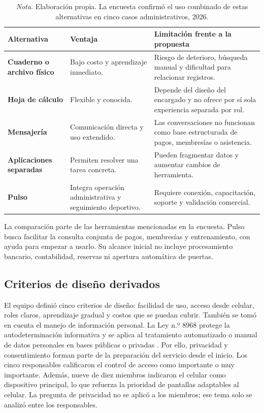 \begin{table}[htbp]
\caption{Comparación preliminar con alternativas de gestión}
\label{tab:alternativas}
\begin{tabularx}{\textwidth}{>{\bfseries}p{2.8cm}X X}
\toprule
Alternativa & Ventaja & Limitación frente a la propuesta \\
\midrule
Cuaderno o archivo físico & Bajo costo y aprendizaje inmediato. & Riesgo de deterioro, búsqueda manual y dificultad para relacionar registros. \\
Hoja de cálculo & Flexible y conocida. & Depende del diseño del encargado y no ofrece por sí sola experiencia separada por rol. \\
Mensajería & Comunicación directa y uso extendido. & Las conversaciones no funcionan como base estructurada de pagos, membresías o asistencia. \\
Aplicaciones separadas & Permiten resolver una tarea concreta. & Pueden fragmentar datos y aumentar cambios de herramienta. \\
Pulso & Integra operación administrativa y seguimiento deportivo. & Requiere conexión, capacitación, soporte y validación comercial. \\
\bottomrule
\end{tabularx}
\caption*{\textit{Nota}. Elaboración propia. La encuesta confirmó el uso combinado de estas alternativas en cinco casos administrativos, 2026.}
\end{table}

La comparación parte de las herramientas mencionadas en la encuesta. Pulso
busca facilitar la consulta conjunta de pagos, membresías y entrenamiento, con
ayuda para empezar a usarlo. Su alcance inicial no incluye procesamiento
bancario, contabilidad, reservas ni apertura automática de puertas.

\subsection{Criterios de diseño derivados}

El equipo definió cinco criterios de diseño: facilidad de uso, acceso desde
celular, roles claros, aprendizaje gradual y costos que se puedan cubrir.
También se tomó en cuenta el manejo de información personal. La Ley n.º 8968
protege la autodeterminación informativa y se aplica al tratamiento automatizado
o manual de datos personales en bases públicas o privadas
\parencite{ley8968}. Por ello, privacidad y consentimiento forman parte de la
preparación del servicio desde el inicio. Los cinco
responsables calificaron el control de acceso como importante o muy importante.
Además, nueve de diez miembros indicaron el celular como dispositivo principal,
lo que refuerza la prioridad de pantallas adaptables al celular. La pregunta de
privacidad no se aplicó a los miembros; ese tema solo se analizó entre los
responsables.
